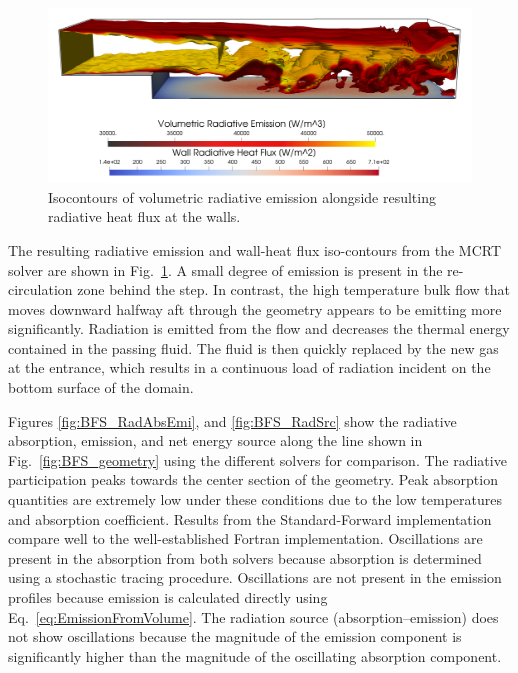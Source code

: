 \begin{figure}
\includegraphics[width=\linewidth]{figures/ch4/BFS_volwallflux3.png}
\caption{Isocontours of volumetric radiative emission alongside resulting radiative heat flux at the walls.}
\label{fig:BFS_radiationcontours}
\end{figure}
The resulting radiative emission and wall-heat flux iso-contours from the MCRT solver are shown in Fig.~\ref{fig:BFS_radiationcontours}.
A small degree of emission is present in the re-circulation zone behind the step. In contrast, the high temperature bulk flow that moves downward halfway aft through the geometry appears to be emitting more significantly.
Radiation is emitted from the flow and decreases the thermal energy contained in the passing fluid. 
The fluid is then quickly replaced by the new gas at the entrance, which results in a continuous load of radiation incident on the bottom surface of the domain. 

Figures \ref{fig:BFS_RadAbsEmi}, and \ref{fig:BFS_RadSrc} show the radiative absorption, emission, and net energy source along the line shown in Fig.~\ref{fig:BFS_geometry} using the different solvers for comparison. 
The radiative participation peaks towards the center section of the geometry. Peak absorption quantities are extremely low under these conditions due to the low temperatures and absorption coefficient. Results from the Standard-Forward implementation compare well to the well-established Fortran implementation. Oscillations are present in the absorption from both solvers because absorption is determined using a stochastic tracing procedure. Oscillations are not present in the emission profiles because emission is calculated directly using Eq.~\ref{eq:EmissionFromVolume}.
The radiation source (absorption–emission) does not show oscillations because the magnitude of the emission component is significantly higher than the magnitude of the oscillating absorption component.


